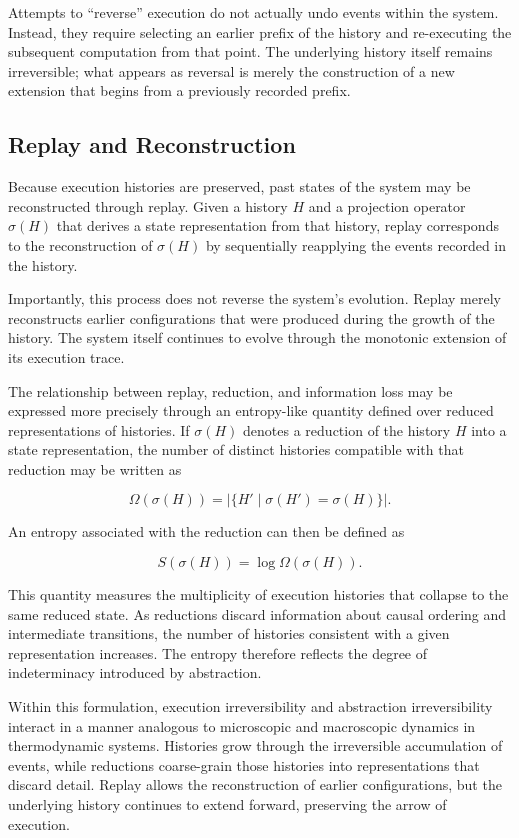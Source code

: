 \documentclass[12pt]{article}
\begin{document}
Attempts to ``reverse'' execution do not actually undo
events within the system. Instead, they require selecting
an earlier prefix of the history and re-executing the
subsequent computation from that point. The underlying
history itself remains irreversible; what appears as
reversal is merely the construction of a new extension
that begins from a previously recorded prefix.

\subsection{Replay and Reconstruction}

Because execution histories are preserved, past states
of the system may be reconstructed through replay.
Given a history $H$ and a projection operator
$\sigma(H)$ that derives a state representation
from that history, replay corresponds to the
reconstruction of $\sigma(H)$ by sequentially
reapplying the events recorded in the history.

Importantly, this process does not reverse the
system’s evolution. Replay merely reconstructs
earlier configurations that were produced during
the growth of the history. The system itself
continues to evolve through the monotonic extension
of its execution trace.

The relationship between replay, reduction, and
information loss may be expressed more precisely
through an entropy-like quantity defined over
reduced representations of histories. If
$\sigma(H)$ denotes a reduction of the history
$H$ into a state representation, the number of
distinct histories compatible with that reduction
may be written as

\[
\Omega(\sigma(H)) =
\left| \{ H' \mid \sigma(H') = \sigma(H) \} \right|.
\]

An entropy associated with the reduction can then
be defined as

\[
S(\sigma(H)) = \log \Omega(\sigma(H)).
\]

This quantity measures the multiplicity of execution
histories that collapse to the same reduced state.
As reductions discard information about causal
ordering and intermediate transitions, the number
of histories consistent with a given representation
increases. The entropy therefore reflects the
degree of indeterminacy introduced by abstraction.

Within this formulation, execution irreversibility
and abstraction irreversibility interact in a manner
analogous to microscopic and macroscopic dynamics in
thermodynamic systems. Histories grow through the
irreversible accumulation of events, while reductions
coarse-grain those histories into representations that
discard detail. Replay allows the reconstruction of
earlier configurations, but the underlying history
continues to extend forward, preserving the arrow
of execution.
\end{document}
